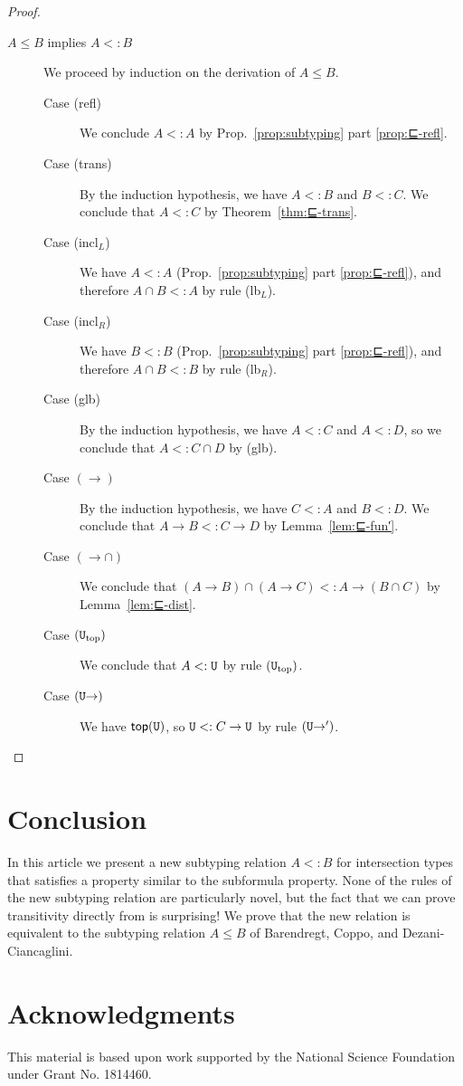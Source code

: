 \documentclass{article}
\begin{document}
\begin{proof}
\begin{description}
  \item[$A \leq B$ implies $A <: B$]
    We proceed by induction on the derivation of $A \leq B$.
    \begin{description}
    \item[Case (refl)] We conclude $A <: A$ by Prop.~\ref{prop:subtyping}
      part \ref{prop:⊑-refl}.
    \item[Case (trans)]
      By the induction hypothesis, we have $A <: B$ and $B <: C$.
      We conclude that $A <: C$ by Theorem~\ref{thm:⊑-trans}.
    \item[Case (incl$_L$)] We have $A <: A$
      (Prop.~\ref{prop:subtyping} part \ref{prop:⊑-refl}),
      and therefore $A \cap B <: A$ by rule (lb$_L$).
    \item[Case (incl$_R$)] We have $B <: B$
      (Prop.~\ref{prop:subtyping} part \ref{prop:⊑-refl}),
      and therefore $A \cap B <: B$ by rule (lb$_R$).
    \item[Case (glb)] By the induction hypothesis, we have
      $A <: C$ and $A <: D$, so we conclude that $A <: C \cap D$ by (glb).
    \item[Case $(\to)$] By the induction hypothesis, we have $C <: A$
      and $B <: D$. We conclude that $A \to B <: C \to D$
      by Lemma~\ref{lem:⊑-fun′}.
    \item[Case $({\to}{\cap})$] We conclude that
      $(A \to B) \cap (A \to C) <: A \to (B \cap C)$
      by Lemma~\ref{lem:⊑-dist}.
    \item[Case $(\mathtt{U}_{\mathrm{top}})$]
      We conclude that $A <: \mathtt{U}$ by rule $(\mathtt{U}_{\mathrm{top}})$.
    \item[Case $(\mathtt{U}{\to})$]
      We have $\mathsf{top}(\mathtt{U})$, so $\mathtt{U} <: C \to \mathtt{U}$ by rule $(\mathtt{U}{\to}')$.
    \end{description}
    
  \end{description}
\end{proof}

\section{Conclusion}
\label{sec:conclude}

In this article we present a new subtyping relation $A <: B$ for
intersection types that satisfies a property similar to the subformula
property.  None of the rules of the new subtyping relation are
particularly novel, but the fact that we can prove transitivity
directly from is surprising!  We prove that the new relation is
equivalent to the subtyping relation $A \leq B$ of Barendregt, Coppo,
and Dezani-Ciancaglini.


\section*{Acknowledgments}

This material is based upon work supported by the National Science
Foundation under Grant No. 1814460.

\pagebreak

%


\end{document}
